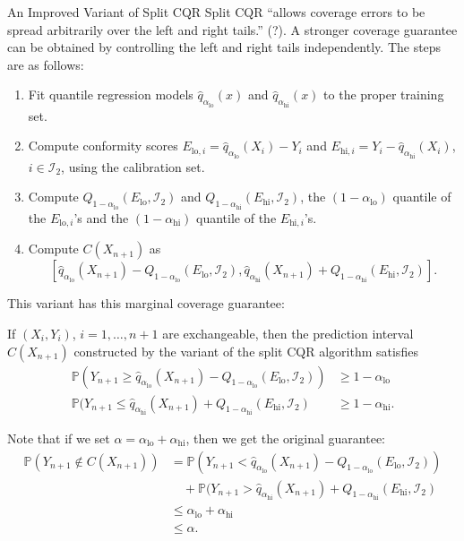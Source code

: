 \documentclass{beamer}
\newcommand{\Prob}{\mathbb{P}}
\begin{document}
\begin{frame}[allowframebreaks]{An Improved Variant of Split CQR}
    Split CQR ``allows coverage errors to be spread arbitrarily over the left and right tails.'' (?). A stronger coverage guarantee can be obtained by controlling the left and right tails independently. The steps are as follows:

    \begin{enumerate}
        \item Fit quantile regression models $\widehat{q}_{\alpha_{\text{lo}}}(x)$ and $\widehat{q}_{\alpha_{\text{hi}}}(x)$ to the proper training set.
        \item Compute conformity scores $E_{\text{lo}, i} = \widehat{q}_{\alpha_{\text{lo}}}(X_i) - Y_i$ and $E_{\text{hi}, i} = Y_i - \widehat{q}_{\alpha_{\text{hi}}}(X_i)$, $i \in \mathcal{I}_2$, using the calibration set.
        \item Compute $Q_{1 - \alpha_{\text{lo}}}(E_{\text{lo}}, \mathcal{I}_2)$ and $Q_{1 - \alpha_{\text{hi}}}(E_{\text{hi}}, \mathcal{I}_2)$, the $(1 - \alpha_{\text{lo}})$ quantile of the $E_{\text{lo}, i}$'s and the $(1 - \alpha_{\text{hi}})$ quantile of the $E_{\text{hi}, i}$'s.
        \item Compute $C(X_{n + 1})$ as
        \[
        [\widehat{q}_{\alpha_{\text{lo}}}(X_{n + 1}) - Q_{1 - \alpha_{\text{lo}}}(E_{\text{lo}}, \mathcal{I}_2), \widehat{q}_{\alpha_{\text{hi}}}(X_{n + 1}) + Q_{1 - \alpha_{\text{hi}}}(E_{\text{hi}}, \mathcal{I}_2)].
        \]
    \end{enumerate}

    \framebreak

    This variant has this marginal coverage guarantee:
    \begin{theorem}[Theorem 1]
        If $(X_i, Y_i)$, $i = 1, \ldots, n + 1$ are exchangeable, then the prediction interval $C(X_{n + 1})$ constructed by the variant of the split CQR algorithm satisfies
        \begin{align*}
            \Prob(Y_{n + 1} \ge \widehat{q}_{\alpha_{\text{lo}}}(X_{n + 1}) - Q_{1 - \alpha_{\text{lo}}}(E_{\text{lo}}, \mathcal{I}_2)) &\ge 1 - \alpha_{\text{lo}} \\
            \Prob(Y_{n + 1} \le \widehat{q}_{\alpha_{\text{hi}}}(X_{n + 1}) + Q_{1 - \alpha_{\text{hi}}}(E_{\text{hi}}, \mathcal{I}_2) &\ge 1 - \alpha_{\text{hi}}.
        \end{align*}
    \end{theorem}
    Note that if we set $\alpha = \alpha_{\text{lo}} + \alpha_{\text{hi}}$, then we get the original guarantee:
    \begin{align*}
        \Prob(Y_{n + 1} \notin C(X_{n + 1})) &= \Prob(Y_{n + 1} < \widehat{q}_{\alpha_{\text{lo}}}(X_{n + 1}) - Q_{1 - \alpha_{\text{lo}}}(E_{\text{lo}}, \mathcal{I}_2)) \\
        &\quad + \Prob(Y_{n + 1} > \widehat{q}_{\alpha_{\text{hi}}}(X_{n + 1}) + Q_{1 - \alpha_{\text{hi}}}(E_{\text{hi}}, \mathcal{I}_2) \\
        &\le \alpha_{\text{lo}} + \alpha_{\text{hi}} \\
        &\le \alpha.
    \end{align*}
\end{frame}
\end{document}
